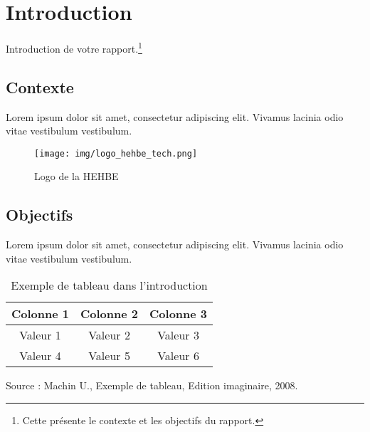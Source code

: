 \chapter{Introduction}
Introduction de votre rapport.\footnote{Cette présente le contexte et les objectifs du rapport.}

\section{Contexte}
Lorem ipsum dolor sit amet, consectetur adipiscing elit. Vivamus lacinia odio vitae vestibulum vestibulum.

\begin{figure}[!ht]
    \centering
    \texttt{[image: img/logo\_hehbe\_tech.png]}
    \caption{Logo de la HEHBE}
    \label{fig:example_figure}
\end{figure}

\section{Objectifs}
Lorem ipsum dolor sit amet, consectetur adipiscing elit. Vivamus lacinia odio vitae vestibulum vestibulum.

\begin{table}[!ht]
    \centering
    \begin{tabular}{|c|c|c|}
        \hline
        Colonne 1 & Colonne 2 & Colonne 3 \\
        \hline
        Valeur 1 & Valeur 2 & Valeur 3 \\
        \hline
        Valeur 4 & Valeur 5 & Valeur 6 \\
        \hline
    \end{tabular}
    \caption{Exemple de tableau dans l'introduction}
    \label{tab:example_table}
    \vspace{0.2cm} %
    Source :  Machin U., Exemple de tableau, Edition imaginaire, 2008.
\end{table}


